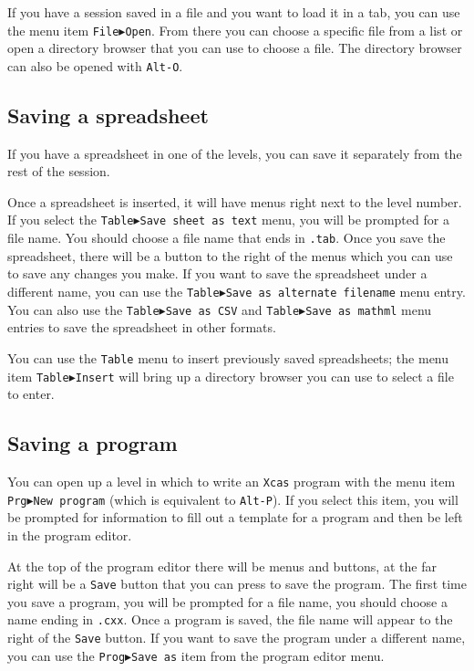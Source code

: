 \documentclass[a4paper,11pt]{book}
\begin{document}
If you have a session saved in a file and you want to load it in a
tab, you can use the menu item \texttt{File$\blacktriangleright$Open}.
From there you can choose a specific file from a list or open a
directory browser that you can use to choose a file.  The directory
browser can also be opened with \texttt{Alt-O}.

\subsection{Saving a spreadsheet}

If you have a spreadsheet in one of the levels, you can save it
separately from the rest of the session.

Once a spreadsheet is inserted, it will have menus right next to the
level number.  If you select the \texttt{Table$\blacktriangleright$Save
sheet as text} menu, you will be prompted for a file name.  You should
choose a file name that ends in \texttt{.tab}.  Once you save the
spreadsheet, there will be a button to the right of the menus which
you can use to save any changes you make.  If you want to save the
spreadsheet under a different name, you can use the
\texttt{Table$\blacktriangleright$Save as alternate filename} menu entry.
You can also use the 
\texttt{Table$\blacktriangleright$Save as CSV} and
\texttt{Table$\blacktriangleright$Save as mathml} menu entries
to save the spreadsheet in other formats.

You can use the \texttt{Table} menu to insert previously saved
spreadsheets; the menu item \texttt{Table$\blacktriangleright$Insert}
will bring up a directory browser you can use to select a file to
enter.

\subsection{Saving a program}

You can open up a level in which to write an \texttt{Xcas} program
with the menu item \texttt{Prg$\blacktriangleright$New program} (which
is equivalent to \texttt{Alt-P}).  If you select this item, you will
be prompted for information to fill out a template for a program and
then be left in the program editor.

At the top of the program editor there will be menus and buttons, at
the far right will be a \texttt{Save} button that you can press to
save the program.  The first time you save a program, you will be
prompted for a file name, you should choose a name ending in
\texttt{.cxx}.  Once a program is saved, the file name will appear to
the right of the \texttt{Save} button.  If you want to save the
program under a different name, you can use the
\texttt{Prog$\blacktriangleright$Save as} item from the program editor
menu.
\end{document}
